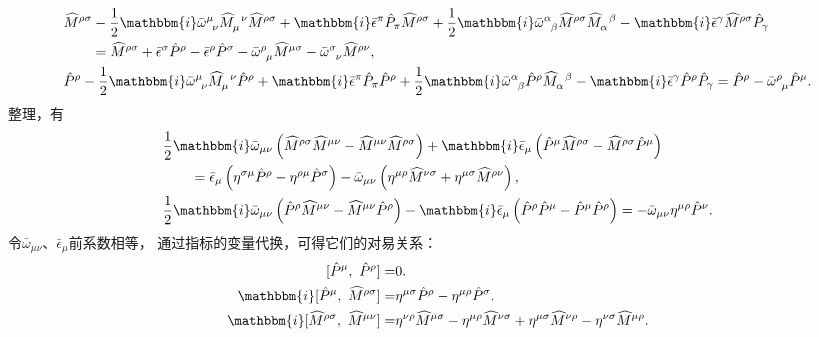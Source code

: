 \begin{align*}
	&\widehat{M}^{\rho\sigma}-\frac{1}{2}\mathbbm{i} \bar{\omega}^\mu_{\hphantom{\nu}\nu}
	\widehat{M}^{\hphantom{\mu}\nu}_{\mu}\widehat{M}^{\rho\sigma}
	+\mathbbm{i}\bar{\epsilon}^{\pi}\hat{P}_{\pi}\widehat{M}^{\rho\sigma}
	+\frac{1}{2}\mathbbm{i} \bar{\omega}^\alpha_{\hphantom{\alpha}\beta}
	\widehat{M}^{\rho\sigma}\widehat{M}^{\hphantom{\alpha}\beta}_{\alpha}
	-\mathbbm{i}\bar{\epsilon}^{\gamma}\widehat{M}^{\rho\sigma}\hat{P}_{\gamma}  \\
	&\qquad = \widehat{M}^{\rho\sigma} + \bar{\epsilon}^\sigma  \hat{P}^{\rho} - \bar{\epsilon}^\rho  \hat{P}^{\sigma}
	-\bar{\omega}^\rho_{\hphantom{\rho}\mu}\widehat{M}^{\mu\sigma}
	-\bar{\omega}^\sigma_{\hphantom{\sigma}\nu} \widehat{M}^{\rho\nu}, \\
	&\hat{P}^{\rho}-\frac{1}{2}\mathbbm{i} \bar{\omega}^\mu_{\hphantom{\nu}\nu}
	\widehat{M}^{\hphantom{\mu}\nu}_{\mu}\hat{P}^{\rho}+\mathbbm{i}\bar{\epsilon}^{\pi}\hat{P}_{\pi}\hat{P}^{\rho}
	+\frac{1}{2}\mathbbm{i} \bar{\omega}^\alpha_{\hphantom{\alpha}\beta}\hat{P}^{\rho}
	\widehat{M}^{\hphantom{\alpha}\beta}_{\alpha}-\mathbbm{i}\bar{\epsilon}^{\gamma}\hat{P}^{\rho}\hat{P}_{\gamma} 
	= \hat{P}^{\rho} -\bar{\omega}^\rho_{\hphantom{\rho}\mu}\hat{P}^{\mu} . 
\end{align*}
整理，有
\begin{align*}
	&\frac{1}{2}\mathbbm{i} \bar{\omega}_{\mu\nu} 
	\left(\widehat{M}^{\rho\sigma}\widehat{M}^{\mu\nu}- \widehat{M}^{\mu\nu}\widehat{M}^{\rho\sigma}\right)
	+\mathbbm{i}\bar{\epsilon}_{\mu} \left(\hat{P}^{\mu}\widehat{M}^{\rho\sigma}
	-\widehat{M}^{\rho\sigma}\hat{P}^{\mu}\right) \\
	&\qquad = \bar{\epsilon}_\mu \left(\eta^{\sigma\mu} \hat{P}^{\rho}-\eta^{\rho\mu} \hat{P}^{\sigma}\right)
	-\bar{\omega}_{\mu\nu}\left(\eta^{\mu\rho}\widehat{M}^{\nu\sigma}
	+\eta^{\mu\sigma} \widehat{M}^{\rho\nu}\right), \\
	&\frac{1}{2}\mathbbm{i} \bar{\omega}_{\mu\nu}
	\left(\hat{P}^{\rho}\widehat{M}^{\mu\nu} - \widehat{M}^{\mu\nu}\hat{P}^{\rho}\right)
	-\mathbbm{i}\bar{\epsilon}_{\mu}\left(\hat{P}^{\rho}\hat{P}^{\mu} -\hat{P}^{\mu}\hat{P}^{\rho}\right)
	= -\bar{\omega}_{\mu\nu}\eta^{\mu\rho} \hat{P}^{\nu} . 
\end{align*}
令$\bar{\omega}_{\mu\nu}$、$\bar{\epsilon}_\mu$前系数相等，
通过指标的变量代换，可得它们的对易关系：
\begin{subequations}\label{chlar:eqn_PLA-M}
	\begin{align}
		[\hat{P}^\mu,\ \hat{P}^\rho] = & 0 .\\
		\mathbbm{i} [\hat{P}^\mu,\ \widehat{M}^{\rho\sigma}] = & 
		\eta^{\mu \sigma} \hat{P}^\rho-\eta^{\mu \rho} \hat{P}^\sigma .\\
		\mathbbm{i} [\widehat{M}^{\rho\sigma},\ \widehat{M}^{\mu\nu}] = & 
		\eta^{\nu \rho} \widehat{M}^{\mu\sigma}-\eta^{\mu \rho} \widehat{M}^{\nu\sigma}
		+\eta^{\mu\sigma} \widehat{M}^{\nu\rho}-\eta^{\nu\sigma} \widehat{M}^{\mu\rho}.
	\end{align}
\end{subequations}
